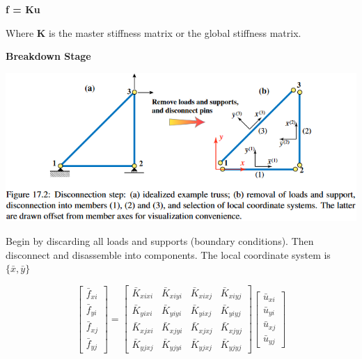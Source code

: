 \documentclass{article}
\begin{document}
\begin{multicols*}{2}
    \begin{center}
        \textbf{f = Ku}
    \end{center}
     
    Where \textbf{K} is the master stiffness matrix or the global stiffness matrix.

    \textbf{Breakdown Stage}\par 
    \includegraphics[width=\linewidth]{Figures/breakdown_stage.png}

    Begin by discarding all loads and supports (boundary conditions). Then disconnect
    and disassemble into components. The local coordinate system is $\{ \bar{x},\bar{y}\}$\par 
    \begin{equation*}
        \begin{bmatrix}
            \bar{f}_{xi}\\
            \bar{f}_{yi}\\
            \bar{f}_{xj}\\
            \bar{f}_{yj}
        \end{bmatrix}
        =
        \begin{bmatrix}
            \bar{K}_{xixi} & \bar{K}_{xiyi} & \bar{K}_{xixj} & \bar{K}_{xiyj}\\
            \bar{K}_{yixi} & \bar{K}_{yiyi} & \bar{K}_{yixj} & \bar{K}_{yiyj}\\
            \bar{K}_{xjxi} & \bar{K}_{xjyi} & \bar{K}_{xjxj} & \bar{K}_{xjyj}\\
            \bar{K}_{yjxj} & \bar{K}_{yjyi} & \bar{K}_{yjxj} & \bar{K}_{yjyj}
        \end{bmatrix}
        \begin{bmatrix}
            \bar{u}_{xi}\\
            \bar{u}_{yi}\\
            \bar{u}_{xj}\\
            \bar{u}_{yj}
        \end{bmatrix}
    \end{equation*}


\end{multicols*}
\end{document}
